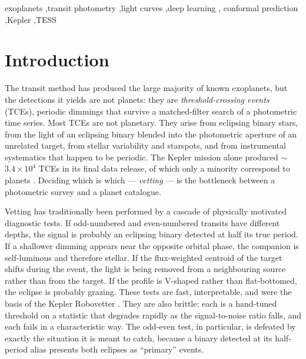 \documentclass[preprint,12pt,authoryear]{elsarticle}
\begin{document}
\begin{frontmatter}
\begin{keyword}
exoplanets \sep transit photometry \sep light curves \sep deep learning \sep
conformal prediction \sep Kepler \sep TESS
\end{keyword}

\end{frontmatter}

\section{Introduction}
\label{sec:intro}

The transit method has produced the large majority of known exoplanets, but the
detections it yields are not planets: they are \emph{threshold-crossing events}
(TCEs), periodic dimmings that survive a matched-filter search of a photometric
time series. Most TCEs are not planetary. They arise from eclipsing binary
stars, from the light of an eclipsing binary blended into the photometric
aperture of an unrelated target, from stellar variability and starspots, and
from instrumental systematics that happen to be periodic. The Kepler mission
alone produced $\sim$$3.4\times10^{4}$ TCEs in its final data release, of which
only a minority correspond to planets \citep{Thompson2018}. Deciding which is
which --- \emph{vetting} --- is the bottleneck between a photometric survey and
a planet catalogue.

Vetting has traditionally been performed by a cascade of physically motivated
diagnostic tests. If odd-numbered and even-numbered transits have different
depths, the signal is probably an eclipsing binary detected at half its true
period. If a shallower dimming appears near the opposite orbital phase, the
companion is self-luminous and therefore stellar. If the flux-weighted centroid
of the target shifts during the event, the light is being removed from a
neighbouring source rather than from the target. If the profile is V-shaped
rather than flat-bottomed, the eclipse is probably grazing. These tests are
fast, interpretable, and were the basis of the Kepler Robovetter
\citep{Thompson2018}. They are also brittle: each is a hand-tuned threshold on a
statistic that degrades rapidly as the signal-to-noise ratio falls, and each
fails in a characteristic way. The odd-even test, in particular, is defeated by
exactly the situation it is meant to catch, because a binary detected at its
half-period alias presents both eclipses as ``primary'' events.
\end{document}
